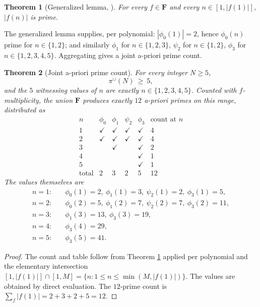 \documentclass[11pt]{article}
\newtheorem{theorem}{Theorem}[section]
\theoremstyle{definition}
\newcommand{\F}{\mathbf{F}}
\newcommand{\F}{\mathcal{F}}
\begin{document}
\begin{theorem}[Generalized lemma, ]\label{thm:gen-lemma}
For every $f\in\F$ and every $n\in[1,|f(1)|]$, $|f(n)|$ is prime.
\end{theorem}

The generalized lemma supplies, per polynomial: $|\phi_0(1)|=2$, hence $\phi_0(n)$ prime for $n\in\{1,2\}$; and similarly $\phi_1$ for $n\in\{1,2,3\}$, $\psi_2$ for $n\in\{1,2\}$, $\phi_3$ for $n\in\{1,2,3,4,5\}$. Aggregating gives a joint a-priori prime count.

\begin{theorem}[Joint a-priori prime count]\label{thm:apriori-joint}
For every integer $N\ge 5$,
\[
\pi^\cup(N)\ \ge\ 5,
\]
and the $5$ witnessing values of $n$ are exactly $n\in\{1,2,3,4,5\}$. Counted with $f$-multiplicity, the union $\F$ produces exactly $12$ a-priori primes on this range, distributed as
\[
\begin{array}{c|cccc|c}
n & \phi_0 & \phi_1 & \psi_2 & \phi_3 & \text{count at }n\\
\hline
1 & \checkmark & \checkmark & \checkmark & \checkmark & 4\\
2 & \checkmark & \checkmark & \checkmark & \checkmark & 4\\
3 & & \checkmark & & \checkmark & 2\\
4 & & & & \checkmark & 1\\
5 & & & & \checkmark & 1\\
\hline
\text{total} & 2 & 3 & 2 & 5 & 12
\end{array}
\]
The values themselves are
\begin{align*}
n=1: &\quad \phi_0(1)=2,\ \phi_1(1)=3,\ \psi_2(1)=2,\ \phi_3(1)=5,\\
n=2: &\quad \phi_0(2)=5,\ \phi_1(2)=7,\ \psi_2(2)=7,\ \phi_3(2)=11,\\
n=3: &\quad \phi_1(3)=13,\ \phi_3(3)=19,\\
n=4: &\quad \phi_3(4)=29,\\
n=5: &\quad \phi_3(5)=41.
\end{align*}
\end{theorem}

\begin{proof}
The count and table follow from Theorem \ref{thm:gen-lemma} applied per polynomial and the elementary intersection $[1,|f(1)|]\cap[1,M]=\{n:1\le n\le \min(M,|f(1)|)\}$. The values are obtained by direct evaluation. The $12$-prime count is $\sum_f|f(1)|=2+3+2+5=12$.
\end{proof}
\end{document}
